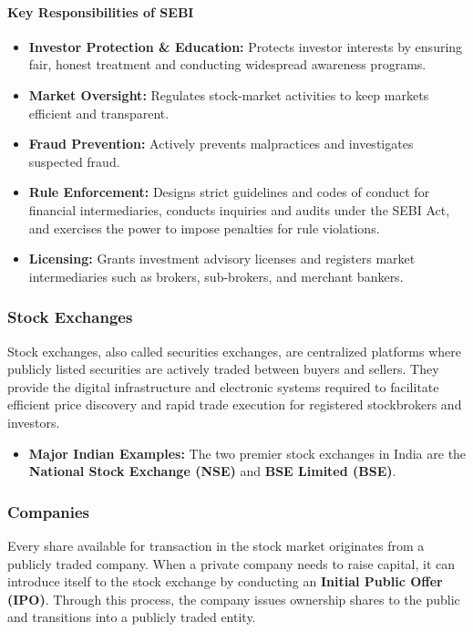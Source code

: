 \documentclass[12pt,openany]{book}
\begin{document}
\paragraph{Key Responsibilities of SEBI}
\begin{itemize}[leftmargin=*]
    \item \textbf{Investor Protection \& Education:} Protects investor interests by ensuring fair, honest treatment and conducting widespread awareness programs.
    \item \textbf{Market Oversight:} Regulates stock-market activities to keep markets efficient and transparent.
    \item \textbf{Fraud Prevention:} Actively prevents malpractices and investigates suspected fraud.
    \item \textbf{Rule Enforcement:} Designs strict guidelines and codes of conduct for financial intermediaries, conducts inquiries and audits under the SEBI Act, and exercises the power to impose penalties for rule violations.
    \item \textbf{Licensing:} Grants investment advisory licenses and registers market intermediaries such as brokers, sub-brokers, and merchant bankers.
\end{itemize}

\subsubsection{Stock Exchanges}
Stock exchanges, also called securities exchanges, are centralized platforms where publicly listed securities are actively traded between buyers and sellers. They provide the digital infrastructure and electronic systems required to facilitate efficient price discovery and rapid trade execution for registered stockbrokers and investors.

\begin{itemize}[leftmargin=*]
    \item \textbf{Major Indian Examples:} The two premier stock exchanges in India are the \textbf{National Stock Exchange (NSE)} and \textbf{BSE Limited (BSE)}.
\end{itemize}

\subsubsection{Companies}
Every share available for transaction in the stock market originates from a publicly traded company. When a private company needs to raise capital, it can introduce itself to the stock exchange by conducting an \textbf{Initial Public Offer (IPO)}. Through this process, the company issues ownership shares to the public and transitions into a publicly traded entity.
\end{document}
